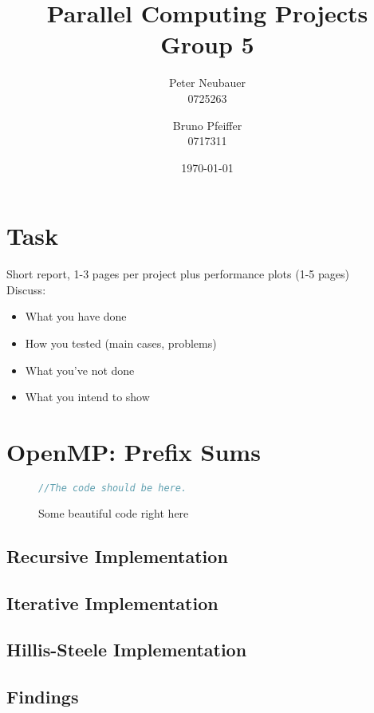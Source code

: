 \documentclass[11pt]{article}
\begin{document}
\title{Parallel Computing Projects\\ Group 5}
\author{Peter Neubauer\\ 0725263 \and Bruno Pfeiffer \\ 0717311}
\date{\today}
\maketitle
\newpage
\tableofcontents

\newpage

\section{Task}
Short report, 1-3 pages per project plus performance plots (1-5 pages)\\
Discuss:
\begin{itemize}
\item What you have done
\item How you tested (main cases, problems)
\item What you've not done
\item What you intend to show
\end{itemize}


\section{OpenMP: Prefix Sums}
\begin{figure}[h]
\caption{Some beautiful code right here}
\begin{lstlisting}[language=C,frame=single]
//The code should be here.
\end{lstlisting}
\end{figure}



\subsection{Recursive Implementation}

\subsection{Iterative Implementation}

\subsection{Hillis-Steele Implementation}

\subsection{Findings}
\end{document}
